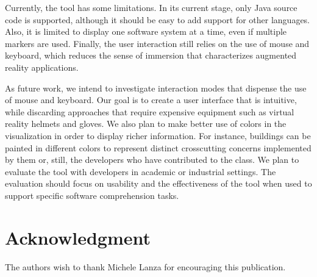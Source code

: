 Currently, the tool has some limitations. In its current stage, only Java source code is supported, although it should be easy to add support for other languages. Also, it is limited to display one software system at a time, even if multiple markers are used. Finally, the user interaction still relies on the use of mouse and keyboard, which reduces the sense of immersion that characterizes augmented reality applications.

As future work, we intend to investigate interaction modes that dispense the use of mouse and keyboard. Our goal is to create a user interface that is intuitive, while discarding approaches that require expensive equipment such as virtual reality helmets and gloves. We also plan to make better use of colors in the visualization in order to display richer information. For instance, buildings can be painted in different colors to represent distinct crosscutting concerns implemented by them or, still, the developers who have contributed to the class. We plan to evaluate the tool with developers in academic or industrial settings. The evaluation should focus on usability and the effectiveness of the tool when used to support specific software comprehension tasks.

\section*{Acknowledgment}
The authors wish to thank Michele Lanza for encouraging this publication.